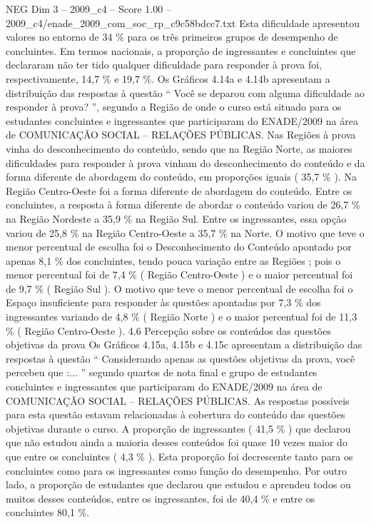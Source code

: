 \begin{textsample}{NEG Dim 3 – 2009\_c4 – Score 1.00 – 2009\_c4/enade\_2009\_com\_soc\_rp\_c9c58bdcc7.txt}
Esta dificuldade apresentou valores no entorno de 34 \% para os três primeiros grupos de desempenho de concluintes.
Em termos nacionais, a proporção de ingressantes e concluintes que declararam não ter tido qualquer dificuldade para responder à prova foi, respectivamente, 14,7 \% e 19,7 \%.
Os Gráficos 4.14a e 4.14b apresentam a distribuição das respostas à questão “ Você se deparou com alguma dificuldade ao responder à prova? ”, segundo a Região de onde o curso está situado para os estudantes concluintes e ingressantes que participaram do ENADE/2009 na área de COMUNICAÇÃO SOCIAL – RELAÇÕES PÚBLICAS.
Nas Regiões à prova vinha do desconhecimento do conteúdo, sendo que na Região Norte, as maiores dificuldades para responder à prova vinham do desconhecimento do conteúdo e da forma diferente de abordagem do conteúdo, em proporções iguais ( 35,7 \% ).
Na Região Centro-Oeste foi a forma diferente de abordagem do conteúdo.
Entre os concluintes, a resposta à forma diferente de abordar o conteúdo variou de 26,7 \% na Região Nordeste a 35,9 \% na Região Sul.
Entre os ingressantes, essa opção variou de 25,8 \% na Região Centro-Oeste a 35,7 \% na Norte.
O motivo que teve o menor percentual de escolha foi o Desconhecimento do Conteúdo apontado por apenas 8,1 \% dos concluintes, tendo pouca variação entre as Regiões ; pois o menor percentual foi de 7,4 \% ( Região Centro-Oeste ) e o maior percentual foi de 9,7 \% ( Região Sul ).
O motivo que teve o menor percentual de escolha foi o Espaço insuficiente para responder às questões apontadas por 7,3 \% dos ingressantes variando de 4,8 \% ( Região Norte ) e o maior percentual foi de 11,3 \% ( Região Centro-Oeste ). 4.6 Percepção sobre os conteúdos das questões objetivas da prova Os Gráficos 4.15a, 4.15b e 4.15c apresentam a distribuição das respostas à questão “ Considerando apenas as questões objetivas da prova, você percebeu que :... ” segundo quartos de nota final e grupo de estudantes concluintes e ingressantes que participaram do ENADE/2009 na área de COMUNICAÇÃO SOCIAL – RELAÇÕES PÚBLICAS.
As respostas possíveis para esta questão estavam relacionadas à cobertura do conteúdo das questões objetivas durante o curso.
A proporção de ingressantes ( 41,5 \% ) que declarou que não estudou ainda a maioria desses conteúdos foi quase 10 vezes maior do que entre os concluintes ( 4,3 \% ).
Esta proporção foi decrescente tanto para os concluintes como para os ingressantes como função do desempenho.
Por outro lado, a proporção de estudantes que declarou que estudou e aprendeu todos ou muitos desses conteúdos, entre os ingressantes, foi de 40,4 \% e entre os concluintes 80,1 \%.

\end{textsample}
